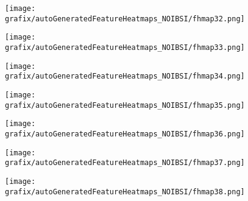\begin{subfigure}{\wid\textwidth} 
    \centering 
    \caption{\tiny \sffamily {}} 
    \vspace{\vsp} 
    \texttt{[image: grafix/autoGeneratedFeatureHeatmaps\_NOIBSI/fhmap32.png]} 
\end{subfigure} 
\hspace{\hsp} 
\begin{subfigure}{\wid\textwidth} 
    \centering 
    \caption{\tiny \sffamily {}} 
    \vspace{\vsp} 
    \texttt{[image: grafix/autoGeneratedFeatureHeatmaps\_NOIBSI/fhmap33.png]} 
\end{subfigure} 
\hspace{\hsp} 
\begin{subfigure}{\wid\textwidth} 
    \centering 
    \caption{\tiny \sffamily {}} 
    \vspace{\vsp} 
    \texttt{[image: grafix/autoGeneratedFeatureHeatmaps\_NOIBSI/fhmap34.png]} 
\end{subfigure} 
\hspace{\hsp} 
\begin{subfigure}{\wid\textwidth} 
    \centering 
    \caption{\tiny \sffamily {}} 
    \vspace{\vsp} 
    \texttt{[image: grafix/autoGeneratedFeatureHeatmaps\_NOIBSI/fhmap35.png]} 
\end{subfigure} 
\hspace{\hsp} 
\begin{subfigure}{\wid\textwidth} 
    \centering 
    \caption{\tiny \sffamily {}} 
    \vspace{\vsp} 
    \texttt{[image: grafix/autoGeneratedFeatureHeatmaps\_NOIBSI/fhmap36.png]} 
\end{subfigure} 
\hspace{\hsp} 
\begin{subfigure}{\wid\textwidth} 
    \centering 
    \caption{\tiny \sffamily {}} 
    \vspace{\vsp} 
    \texttt{[image: grafix/autoGeneratedFeatureHeatmaps\_NOIBSI/fhmap37.png]} 
\end{subfigure} 
\hspace{\hsp} 
\begin{subfigure}{\wid\textwidth} 
    \centering 
    \caption{\tiny \sffamily {}} 
    \vspace{\vsp} 
    \texttt{[image: grafix/autoGeneratedFeatureHeatmaps\_NOIBSI/fhmap38.png]} 
\end{subfigure} 
